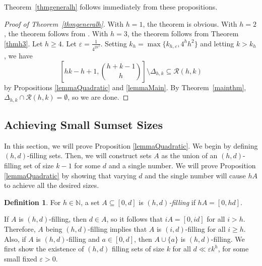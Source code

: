\documentclass[10pt,a4paper]{article}
\theoremstyle{definition}
\newtheorem{definition}[theorem]{Definition}
\theoremstyle{remark}
\numberwithin{equation}{section}
\numberwithin{theorem}{section}
\newcommand{\N}{\mathbb{N}}
\newcommand{\calr}{\mathcal{R}}
\begin{document}
Theorem~\ref{thmgeneralh} follows immediately from these propositions.

\begin{proof}[Proof of Theorem~\ref{thmgeneralh}]
    With $h=1$, the theorem is obvious. With $h=2$, the theorem follows from \cite{ES83}. With $h=3$, the theorem follows from Theorem \ref{thmh3}. Let $h \geq 4$. Let $\varepsilon = \frac{1}{4^{2h^2}}$. Setting $k_h = \max\{k_{h,\varepsilon},4^hh^2\}$ and letting $k>k_h$, we have \[\left[hk-h+1,\binom{h+k-1}{h}\right]\setminus \Delta_{h,k} \subseteq \calr(h,k)\] by Propositions \ref{lemmaQuadratic} and \ref{lemmaMain}. By Theorem~\ref{mainthm}, $\Delta_{h,k} \cap \calr(h,k) = \emptyset$, so we are done.
\end{proof}

\subsection{Achieving Small Sumset Sizes}\label{sectlemmaquad}
In this section, we will prove Proposition \ref{lemmaQuadratic}. We begin by defining $(h,d)$-filling sets. Then, we will construct sets $A$ as the union of an $(h,d)$-filling set of size $k-1$ for some $d$ and a single number. We will prove Proposition \ref{lemmaQuadratic} by showing that varying $d$ and the single number will cause $hA$ to achieve all the desired sizes. 

\begin{definition}
    For $h \in \N$, a set $A \subseteq [0,d]$ is \emph{$(h,d)$-filling} if $hA = [0,hd]$.
\end{definition}


If $A$ is $(h,d)$-filling, then $d \in A$, so it follows that $iA = [0,id]$ for all $i > h$. Therefore, $A$ being $(h,d)$-filling implies that $A$ is $(i,d)$-filling for all $i \geq h$. Also, if $A$ is $(h,d)$-filling and $a \in [0,d]$, then $A \cup \{a\}$ is $(h,d)$-filling. We first show the existence of $(h,d)$ filling sets of size $k$ for all $d \ll \varepsilon k^h$, for some small fixed $\varepsilon>0$.
\end{document}

